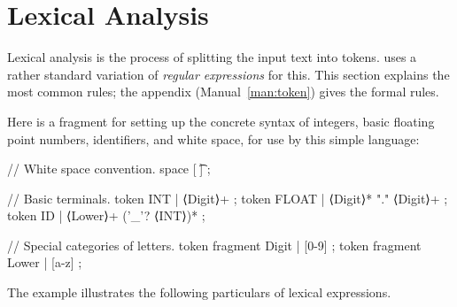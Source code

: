 \documentclass[11pt]{article} %
\begin{document}
\section{Lexical Analysis}
\label{sec:tokens}

Lexical analysis is the process of splitting the input text into tokens. \HAX uses a rather standard
variation of \emph{regular expressions} for this. This section explains the most common rules; the
appendix (Manual~\ref{man:token}) gives the formal rules.

\begin{example}\label{ex:lexical}
  Here is a \HAX fragment for setting up the concrete syntax of integers, basic floating point
  numbers, identifiers, and white space, for use by this simple language:
  \begin{hacs}[xleftmargin=\parindent,numbers=right,texcl]
// White space convention.
space [ \t\n] ;

// Basic terminals.
token INT  | ⟨Digit⟩+ ;
token FLOAT  | ⟨Digit⟩* "." ⟨Digit⟩+ ;
token ID  | ⟨Lower⟩+ ('_'? ⟨INT⟩)* ;

// Special categories of letters.
token fragment Digit  | [0-9] ;
token fragment Lower  | [a-z] ;
  \end{hacs}
\end{example}

The example illustrates the following particulars of \HAX lexical expressions.
\end{document}
